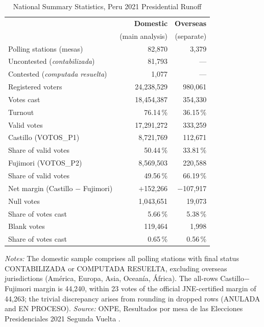 \documentclass[12pt]{article}
\begin{document}
\begin{table}[H]
\centering
\caption{National Summary Statistics, Peru 2021 Presidential Runoff}
\label{tab:summary}
\begin{tabular}{lrr}
\toprule
 & \textbf{Domestic} & \textbf{Overseas} \\
 & (main analysis) & (separate) \\
\midrule
Polling stations (mesas) & 82,870 & 3,379 \\
\quad Uncontested (\emph{contabilizada}) & 81,793 & --- \\
\quad Contested (\emph{computada resuelta}) & 1,077 & --- \\
Registered voters & 24,238,529 & 980,061 \\
Votes cast & 18,454,387 & 354,330 \\
Turnout & 76.14\,\% & 36.15\,\% \\
\midrule
Valid votes & 17,291,272 & 333,259 \\
Castillo (VOTOS\_P1) & 8,721,769 & 112,671 \\
\quad Share of valid votes & 50.44\,\% & 33.81\,\% \\
Fujimori (VOTOS\_P2) & 8,569,503 & 220,588 \\
\quad Share of valid votes & 49.56\,\% & 66.19\,\% \\
Net margin (Castillo $-$ Fujimori) & $+$152,266 & $-$107,917 \\
\midrule
Null votes & 1,043,651 & 19,073 \\
\quad Share of votes cast & 5.66\,\% & 5.38\,\% \\
Blank votes & 119,464 & 1,998 \\
\quad Share of votes cast & 0.65\,\% & 0.56\,\% \\
\bottomrule
\end{tabular}
\vspace{0.2cm}
\begin{minipage}{\textwidth}
\footnotesize
\textit{Notes:} The domestic sample comprises all polling stations with final
status CONTABILIZADA or COMPUTADA RESUELTA, excluding overseas jurisdictions
(Am\'erica, Europa, Asia, Ocean\'ia, \'Africa).
The all-rows Castillo$-$Fujimori margin is 44,240, within 23 votes of the
official JNE-certified margin of 44,263; the trivial discrepancy arises from
rounding in dropped rows (ANULADA and EN PROCESO).
\textit{Source:} ONPE, Resultados por mesa de las Elecciones Presidenciales
2021 Segunda Vuelta \citep{onpe2021}.
\end{minipage}
\end{table}
\end{document}
